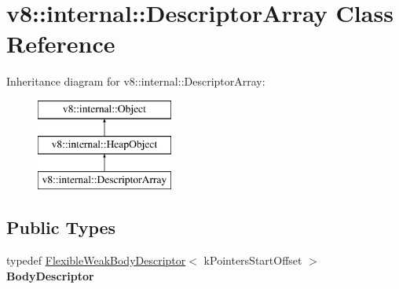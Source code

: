 \hypertarget{classv8_1_1internal_1_1DescriptorArray}{}\section{v8\+:\+:internal\+:\+:Descriptor\+Array Class Reference}
\label{classv8_1_1internal_1_1DescriptorArray}
Inheritance diagram for v8\+:\+:internal\+:\+:Descriptor\+Array\+:\begin{figure}[H]
\begin{center}
\leavevmode
\includegraphics[height=3.000000cm]{classv8_1_1internal_1_1DescriptorArray}
\end{center}
\end{figure}
\subsection*{Public Types}
\begin{DoxyCompactItemize}
\item 
\mbox{\label{classv8_1_1internal_1_1DescriptorArray_aaba93ec3f0341fd8e07aa7f53fa3ba5a}} 
typedef \mbox{\hyperlink{classv8_1_1internal_1_1FlexibleWeakBodyDescriptor}{Flexible\+Weak\+Body\+Descriptor}}$<$ k\+Pointers\+Start\+Offset $>$ {\bfseries Body\+Descriptor}
\end{DoxyCompactItemize}
